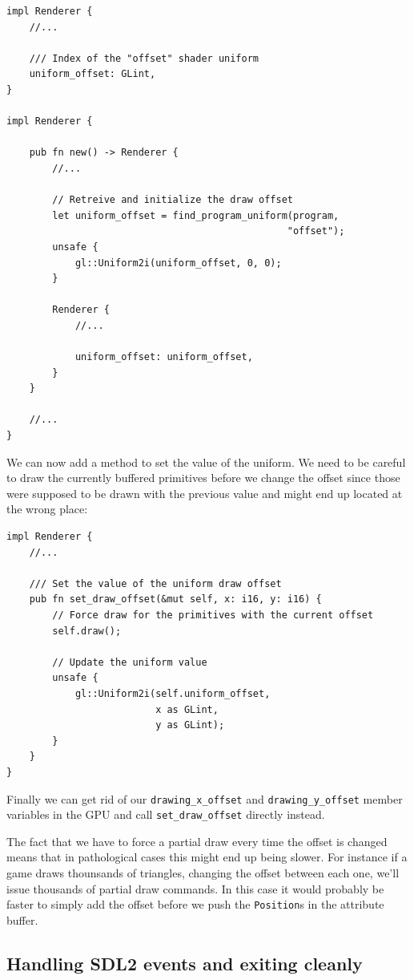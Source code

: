 \documentclass[a4paper]{article}
\newcommand{\code}[1] {\texttt{#1}}
\begin{document}
\begin{lstlisting}
impl Renderer {
    //...

    /// Index of the "offset" shader uniform
    uniform_offset: GLint,
}

impl Renderer {

    pub fn new() -> Renderer {
        //...

        // Retreive and initialize the draw offset
        let uniform_offset = find_program_uniform(program,
                                                 "offset");
        unsafe {
            gl::Uniform2i(uniform_offset, 0, 0);
        }

        Renderer {
            //...

            uniform_offset: uniform_offset,
        }
    }

    //...
}
\end{lstlisting}

We can now add a method to set the value of the uniform. We need to be
careful to draw the currently buffered primitives before we change the
offset since those were supposed to be drawn with the previous value
and might end up located at the wrong place:

\begin{lstlisting}
impl Renderer {
    //...

    /// Set the value of the uniform draw offset
    pub fn set_draw_offset(&mut self, x: i16, y: i16) {
        // Force draw for the primitives with the current offset
        self.draw();

        // Update the uniform value
        unsafe {
            gl::Uniform2i(self.uniform_offset,
                          x as GLint,
                          y as GLint);
        }
    }
}
\end{lstlisting}

Finally we can get rid of our \code{drawing\_x\_offset} and
\code{drawing\_y\_offset} member variables in the GPU and call
\code{set\_draw\_offset} directly instead.

The fact that we have to force a partial draw every time the offset is
changed means that in pathological cases this might end up being
slower. For instance if a game draws thounsands of triangles, changing
the offset between each one, we'll issue thousands of partial draw
commands. In this case it would probably be faster to simply add the
offset before we push the \code{Position}s in the attribute buffer.

\subsection{Handling SDL2 events and exiting cleanly}
\end{document}
